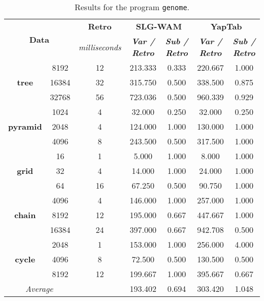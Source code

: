 \begin{table}[ht]
\centering
\footnotesize{
  \begin{tabular}{cc|c|cc|cc}
   \hline
    \hline
    \multicolumn{2}{c|}{\multirow{2}{*}{\small{\textbf{Data}}}} & \textbf{\small{Retro}} & \multicolumn{2}{c|}{\small{\textbf{SLG-WAM}}} & \multicolumn{2}{c}{\small{\textbf{YapTab}}} \\
     \multicolumn{2}{c|}{} & \scriptsize{\textit{milliseconds}} & \textbf{\textit{\scriptsize{Var / Retro}}} & \textbf{\textit{\scriptsize{Sub / Retro}}} & \textbf{\textit{\scriptsize{Var / Retro}}} & \textbf{\textit{\scriptsize{Sub / Retro}}} \\
   \hline
   \hline

\multirow{3}{*}{\textbf{tree}} &  8192 &  12 &  213.333  &  0.333  &  220.667 & 1.000 \\
&  16384 &  32 &  315.750  &  0.500  &  338.500 & 0.875 \\
&  32768 &  56 &  723.036  &  0.500  &  960.339 & 0.929 \\
\hline
\multirow{3}{*}{\textbf{pyramid}} &  1024 &  4 &  32.000  &  0.250  &  32.000 & 0.250 \\
&  2048 &  4 &  124.000  &  1.000  &  130.000 & 1.000 \\
&  4096 &  8 &  243.500  &  0.500  &  317.500 & 1.000 \\
\hline
\multirow{3}{*}{\textbf{grid}} &  16 &  1 &  5.000  &  1.000  &  8.000 & 1.000 \\
&  32 &  4 &  14.000  &  1.000  &  24.000 & 1.000 \\
&  64 &  16 &  67.250  &  0.500  &  90.750 & 1.000 \\
\hline
\multirow{3}{*}{\textbf{chain}} &  4096 &  4 &  146.000  &  1.000  &  257.000 & 1.000 \\
&  8192 &  12 &  195.000  &  0.667  &  447.667 & 1.000 \\
&  16384 &  24 &  397.000  &  0.667  &  942.708 & 0.500 \\
\hline
\multirow{3}{*}{\textbf{cycle}} &  2048 &  1 &  153.000  &  1.000  &  256.000 & 4.000 \\
&  4096 &  8 &  72.500  &  0.500  &  130.500 & 0.500 \\
&  8192 &  12 &  199.667  &  1.000  &  395.667 & 0.667 \\
\hline
\hline
\multicolumn{2}{c}{\textit{Average}} & & 193.402 & 0.694 & 303.420 & 1.048 \\ 
\hline
\hline
\end{tabular}
}
\caption{Results for the program \texttt{genome}.}
\label{tbl:prefix_genome}
\end{table}

